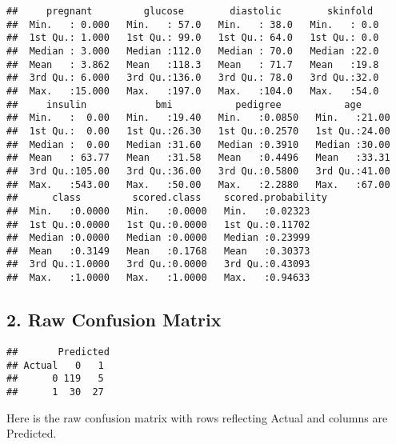 \documentclass[
]{article}
\newenvironment{Shaded}{\begin{snugshade}}{\end{snugshade}}
\newcommand{\KeywordTok}[1]{\textcolor[rgb]{0.13,0.29,0.53}{\textbf{#1}}}
\newcommand{\NormalTok}[1]{#1}
\newcommand{\OperatorTok}[1]{\textcolor[rgb]{0.81,0.36,0.00}{\textbf{#1}}}
\newcommand{\StringTok}[1]{\textcolor[rgb]{0.31,0.60,0.02}{#1}}
\begin{document}
\begin{verbatim}
##     pregnant         glucose        diastolic        skinfold   
##  Min.   : 0.000   Min.   : 57.0   Min.   : 38.0   Min.   : 0.0  
##  1st Qu.: 1.000   1st Qu.: 99.0   1st Qu.: 64.0   1st Qu.: 0.0  
##  Median : 3.000   Median :112.0   Median : 70.0   Median :22.0  
##  Mean   : 3.862   Mean   :118.3   Mean   : 71.7   Mean   :19.8  
##  3rd Qu.: 6.000   3rd Qu.:136.0   3rd Qu.: 78.0   3rd Qu.:32.0  
##  Max.   :15.000   Max.   :197.0   Max.   :104.0   Max.   :54.0  
##     insulin            bmi           pedigree           age       
##  Min.   :  0.00   Min.   :19.40   Min.   :0.0850   Min.   :21.00  
##  1st Qu.:  0.00   1st Qu.:26.30   1st Qu.:0.2570   1st Qu.:24.00  
##  Median :  0.00   Median :31.60   Median :0.3910   Median :30.00  
##  Mean   : 63.77   Mean   :31.58   Mean   :0.4496   Mean   :33.31  
##  3rd Qu.:105.00   3rd Qu.:36.00   3rd Qu.:0.5800   3rd Qu.:41.00  
##  Max.   :543.00   Max.   :50.00   Max.   :2.2880   Max.   :67.00  
##      class         scored.class    scored.probability
##  Min.   :0.0000   Min.   :0.0000   Min.   :0.02323   
##  1st Qu.:0.0000   1st Qu.:0.0000   1st Qu.:0.11702   
##  Median :0.0000   Median :0.0000   Median :0.23999   
##  Mean   :0.3149   Mean   :0.1768   Mean   :0.30373   
##  3rd Qu.:1.0000   3rd Qu.:0.0000   3rd Qu.:0.43093   
##  Max.   :1.0000   Max.   :1.0000   Max.   :0.94633
\end{verbatim}

\hypertarget{raw-confusion-matrix}{%
\subsection{2. Raw Confusion Matrix}\label{raw-confusion-matrix}}

\begin{Shaded}
\end{Shaded}

\begin{verbatim}
##       Predicted
## Actual   0   1
##      0 119   5
##      1  30  27
\end{verbatim}

Here is the raw confusion matrix with rows reflecting Actual and columns
are Predicted.
\end{document}
